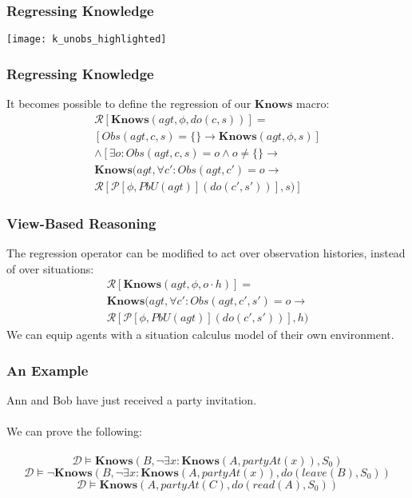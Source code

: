 \documentclass{beamer}
\newcommand{\Dt}{\mathcal{D}}
\newcommand{\Knows}{\mathbf{Knows}}
\begin{document}
\begin{frame}
\frametitle{Regressing Knowledge}
\begin{center}
  \texttt{[image: k\_unobs\_highlighted]}
\end{center}
\end{frame}

\begin{frame}
\frametitle{Regressing Knowledge}
It becomes possible to define the regression of our $\mathbf{Knows}$ macro:
\begin{multline*}
  \mathcal{R}[\mathbf{Knows}(agt,\phi,do(c,s))] = \\
     \left[ Obs(agt,c,s) = \{\} \rightarrow \mathbf{Knows}(agt,\phi,s) \right] \\
     \wedge \left[ \exists o : Obs(agt,c,s) = o \wedge o\neq \{\} \rightarrow \right. \\
     \mathbf{Knows}(agt,\forall c' : Obs(agt,c')=o \rightarrow \\
     \left.\mathcal{R}[\mathcal{P}[\phi,PbU(agt)](do(c',s'))],s)\right]
\end{multline*}
\end{frame}

\begin{frame}
\frametitle{View-Based Reasoning}
The regression operator can be modified to act over observation histories,
instead of over situations:
\begin{multline*}
  \mathcal{R}[\mathbf{Knows}(agt,\phi,o \cdot h)] = \\
  \mathbf{Knows}(agt,\forall c' : Obs(agt,c',s')=o \rightarrow \\
     \mathcal{R}[\mathcal{P}[\phi,PbU(agt)](do(c',s'))],h)
\end{multline*}
We can equip agents with a situation calculus model of their own environment.
\end{frame}

\begin{frame}
\frametitle{An Example}
Ann and Bob have just received a party invitation.
\ \\
\ \\
We can prove the following:
\ \\
\ \\
\pause
\begin{equation*}
\Dt \models \Knows(B,\neg\exists x: \Knows(A,partyAt(x)),S_0)
\end{equation*}
\pause
\begin{equation*}
\Dt \models \neg\Knows(B,\neg\exists x: \Knows(A,partyAt(x)),do(leave(B),S_0))
\end{equation*}
\pause
\begin{equation*}
\Dt \models \Knows(A,partyAt(C),do(read(A),S_0))
\end{equation*}
\end{frame}
\end{document}
